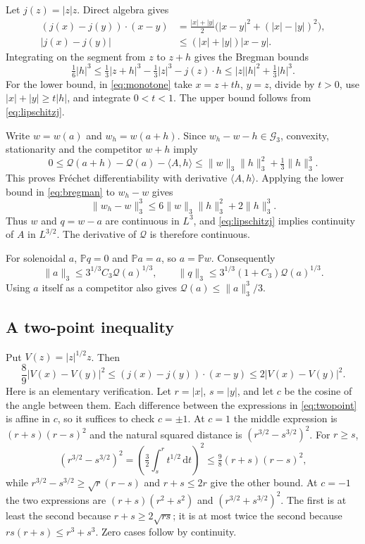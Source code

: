 \documentclass[11pt,a4paper]{article}
\theoremstyle{definition}\newtheorem{definition}[theorem]{Definition}
\theoremstyle{remark}\newtheorem{remark}[theorem]{Remark}
\newcommand{\PP}{\mathbb P}
\newcommand{\G}{\mathcal G_3}
\newcommand{\Q}{\mathcal Q}
\newcommand{\dd}{\,\mathrm d}
\newcommand{\norm}[1]{\lVert #1\rVert}
\newcommand{\ip}[2]{\langle #1,#2\rangle}
\numberwithin{equation}{section}
\begin{document}
Let $j(z)=|z|z$. Direct algebra gives
\begin{align}
 (j(x)-j(y))\cdot(x-y)
 &=\tfrac{|x|+|y|}{2}\bigl(|x-y|^2+(|x|-|y|)^2\bigr),\label{eq:monotone}\\
 |j(x)-j(y)|&\le(|x|+|y|)|x-y|.\label{eq:lipschitzj}
\end{align}
Integrating on the segment from $z$ to $z+h$ gives the Bregman bounds
\begin{equation}\label{eq:bregman}
 \tfrac16|h|^3\le\tfrac13|z+h|^3-\tfrac13|z|^3-j(z)\cdot h
 \le |z||h|^2+\tfrac13|h|^3.
\end{equation}
For the lower bound, in \eqref{eq:monotone} take $x=z+th$, $y=z$, divide by $t>0$, use $|x|+|y|\ge t|h|$, and integrate $0<t<1$. The upper bound follows from \eqref{eq:lipschitzj}.

Write $w=w(a)$ and $w_h=w(a+h)$. Since $w_h-w-h\in\G$, convexity, stationarity and the competitor $w+h$ imply
\begin{equation}\label{eq:Qremainder}
 0\le\Q(a+h)-\Q(a)-\ip Ah
 \le\norm w_3\norm h_3^2+\tfrac13\norm h_3^3.
\end{equation}
This proves Fr\'echet differentiability with derivative $\ip Ah$. Applying the lower bound in \eqref{eq:bregman} to $w_h-w$ gives
\[
 \norm{w_h-w}_3^3\le6\norm w_3\norm h_3^2+2\norm h_3^3.
\]
Thus $w$ and $q=w-a$ are continuous in $L^3$, and \eqref{eq:lipschitzj} implies continuity of $A$ in $L^{3/2}$. The derivative of $\Q$ is therefore continuous.

For solenoidal $a$, $\PP q=0$ and $\PP a=a$, so $a=\PP w$. Consequently
\begin{equation}\label{eq:quotientcoercivity}
 \norm a_3\le3^{1/3}C_3\Q(a)^{1/3},\qquad
 \norm q_3\le3^{1/3}(1+C_3)\Q(a)^{1/3}.
\end{equation}
Using $a$ itself as a competitor also gives $\Q(a)\le\norm a_3^3/3$.

\subsection{A two-point inequality}
Put $V(z)=|z|^{1/2}z$. Then
\begin{equation}\label{eq:twopoint}
 \frac89|V(x)-V(y)|^2
 \le(j(x)-j(y))\cdot(x-y)
 \le2|V(x)-V(y)|^2.
\end{equation}
Here is an elementary verification. Let $r=|x|$, $s=|y|$, and let $c$ be the cosine of the angle between them. Each difference between the expressions in \eqref{eq:twopoint} is affine in $c$, so it suffices to check $c=\pm1$. At $c=1$ the middle expression is $(r+s)(r-s)^2$ and the natural squared distance is $(r^{3/2}-s^{3/2})^2$. For $r\ge s$,
\[
 (r^{3/2}-s^{3/2})^2
 =\left(\tfrac32\int_s^r t^{1/2}\dd t\right)^2
 \le\tfrac98(r+s)(r-s)^2,
\]
while $r^{3/2}-s^{3/2}\ge\sqrt r(r-s)$ and $r+s\le2r$ give the other bound. At $c=-1$ the two expressions are $(r+s)(r^2+s^2)$ and $(r^{3/2}+s^{3/2})^2$. The first is at least the second because $r+s\ge2\sqrt{rs}$; it is at most twice the second because $rs(r+s)\le r^3+s^3$. Zero cases follow by continuity.
\end{document}
